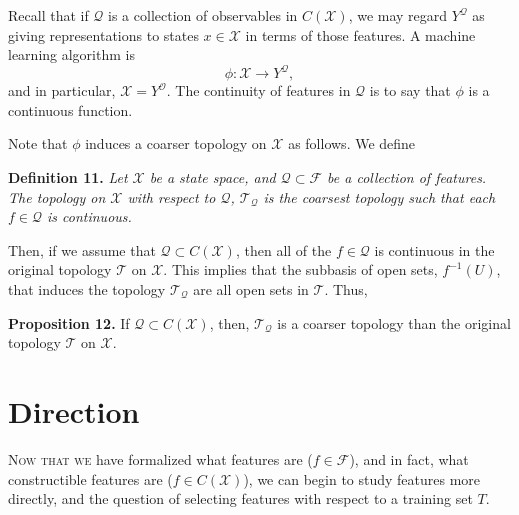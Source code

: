 \documentclass[10]{article}
\theoremstyle{plain}
\begin{document}
Recall that if $\mathcal{Q}$ is a collection of observables in $C(\mathcal{X})$, we may regard $Y^\mathcal{Q}$ as giving representations to states $x \in \mathcal{X}$ in terms of those features. A machine learning algorithm is \[\phi: \mathcal{X} \to Y^\mathcal{Q},\]
and in particular, $\mathcal{X} = Y^\mathcal{O}$. The continuity of features in $\mathcal{Q}$ is to say that $\phi$ is a continuous function.

Note that $\phi$ induces a coarser topology on $\mathcal{X}$ as follows. We define

\textbf{Definition 11.}
\emph{Let $\mathcal{X}$ be a state space, and $\mathcal{Q} \subset \mathcal{F}$ be a collection of features. The \emph{topology on $\mathcal{X}$ with respect to $\mathcal{Q}$}, $\mathcal{T}_\mathcal{Q}$ is the coarsest topology such that each $f \in \mathcal{Q}$ is continuous.}

Then, if we assume that $\mathcal{Q} \subset C(\mathcal{X})$, then all of the $f \in \mathcal{Q}$ is continuous in the original topology $\mathcal{T}$ on $\mathcal{X}$. This implies that the subbasis of open sets, $f^{-1}(U)$, that induces the topology $\mathcal{T}_\mathcal{Q}$ are all open sets in $\mathcal{T}$. Thus,

\textbf{Proposition 12.}
If $\mathcal{Q} \subset C(\mathcal{X})$, then, $\mathcal{T}_\mathcal{Q}$ is a coarser topology than the original topology $\mathcal{T}$ on $\mathcal{X}$.


\section{Direction}
\textsc{Now that we} have formalized what features are ($f \in \mathcal{F}$), and in fact, what constructible features are ($f\in C(\mathcal{X})$), we can begin to study features more directly, and the question of selecting features with respect to a training set $T$.
\end{document}
